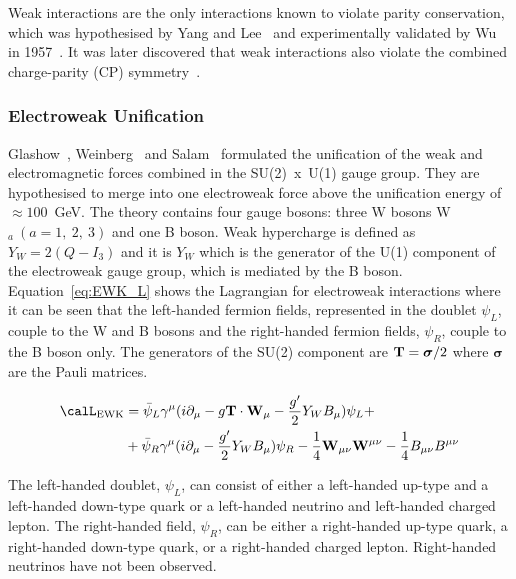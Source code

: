 Weak interactions are the only interactions known to violate parity conservation, which was hypothesised by Yang and Lee~\cite{PhysRev.104.254} and experimentally validated by Wu in 1957~\cite{PhysRev.105.1413}. It was later discovered that weak interactions also violate the combined charge-parity (CP) symmetry~\cite{Cronin2012,PhysRevLett.13.138}.

\subsubsection{Electroweak Unification}

Glashow~\cite{Glashow:1961tr}, Weinberg~\cite{PhysRevLett.19.1264} and Salam~\cite{Salam:1968rm} formulated the unification of the weak and electromagnetic forces combined in the SU(2)~x~U(1) gauge group. They are hypothesised to merge into one electroweak force above the unification energy of $\approx 100$~GeV. The theory contains four gauge bosons: three W bosons W$_{a}~(a=1,~2,~3)$ and one B boson. Weak hypercharge is defined as $Y_{W} = 2(Q-I_{3})$ and it is $Y_W$ which is the generator of the U(1) component of the electroweak gauge group, which is mediated by the B boson. Equation~\ref{eq:EWK_L} shows the Lagrangian for electroweak interactions where it can be seen that the left-handed fermion fields, represented in the doublet $\psi_{L}$, couple to the W and B bosons and the right-handed fermion fields, $\psi_{R}$, couple to the B boson only. The generators of the SU(2) component are ${\bf T} = \boldsymbol{\sigma}/2$ where $\boldsymbol{\sigma}$ are the Pauli matrices.

\begin{equation}
\label{eq:EWK_L}
\begin{split}
\calL_\textrm{EWK} & = \bar{\psi}_L \gamma^\mu ( i\partial_\mu  - g \mathbf{T} \cdot \mathbf{W}_\mu - \frac{g'}{2} Y_{W}
B_\mu) \psi_L + \\ & + \bar{\psi}_R \gamma^\mu (i \partial_\mu - \frac{g'}{2} Y_{W} B_\mu) \psi_R -
\frac{1}{4}\mathbf{W}_{\mu\nu} \mathbf{W}^{\mu\nu} -\frac{1}{4}B_{\mu\nu} B^{\mu\nu}
\end{split}
\end{equation}

The left-handed doublet, $\psi_L$, can consist of either a left-handed up-type and a left-handed down-type quark or a left-handed neutrino and left-handed charged lepton. The right-handed field, $\psi_R$, can be either a right-handed up-type quark, a right-handed down-type quark, or a right-handed charged lepton. Right-handed neutrinos have not been observed.

